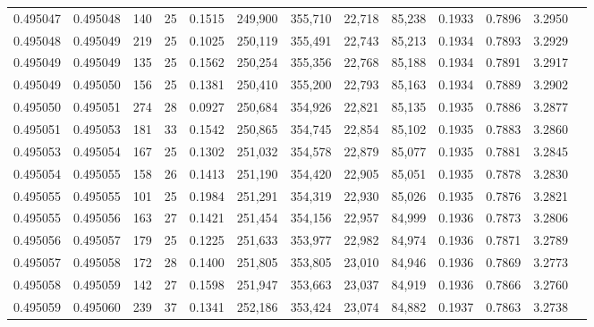 \begin{tabular}{rrrrrrrrrrrrr}
0.495047 & 0.495048 & 140 &  25 &                                     0.1515 & 249,900 & 355,710 &  22,718 &  85,238 & 0.1933 & 0.7896 & 3.2950 \\
0.495048 & 0.495049 & 219 &  25 &                                     0.1025 & 250,119 & 355,491 &  22,743 &  85,213 & 0.1934 & 0.7893 & 3.2929 \\
0.495049 & 0.495049 & 135 &  25 &                                     0.1562 & 250,254 & 355,356 &  22,768 &  85,188 & 0.1934 & 0.7891 & 3.2917 \\
0.495049 & 0.495050 & 156 &  25 &                                     0.1381 & 250,410 & 355,200 &  22,793 &  85,163 & 0.1934 & 0.7889 & 3.2902 \\
0.495050 & 0.495051 & 274 &  28 &                                     0.0927 & 250,684 & 354,926 &  22,821 &  85,135 & 0.1935 & 0.7886 & 3.2877 \\
0.495051 & 0.495053 & 181 &  33 &                                     0.1542 & 250,865 & 354,745 &  22,854 &  85,102 & 0.1935 & 0.7883 & 3.2860 \\
0.495053 & 0.495054 & 167 &  25 &                                     0.1302 & 251,032 & 354,578 &  22,879 &  85,077 & 0.1935 & 0.7881 & 3.2845 \\
0.495054 & 0.495055 & 158 &  26 &                                     0.1413 & 251,190 & 354,420 &  22,905 &  85,051 & 0.1935 & 0.7878 & 3.2830 \\
0.495055 & 0.495055 & 101 &  25 &                                     0.1984 & 251,291 & 354,319 &  22,930 &  85,026 & 0.1935 & 0.7876 & 3.2821 \\
0.495055 & 0.495056 & 163 &  27 &                                     0.1421 & 251,454 & 354,156 &  22,957 &  84,999 & 0.1936 & 0.7873 & 3.2806 \\
0.495056 & 0.495057 & 179 &  25 &                                     0.1225 & 251,633 & 353,977 &  22,982 &  84,974 & 0.1936 & 0.7871 & 3.2789 \\
0.495057 & 0.495058 & 172 &  28 &                                     0.1400 & 251,805 & 353,805 &  23,010 &  84,946 & 0.1936 & 0.7869 & 3.2773 \\
0.495058 & 0.495059 & 142 &  27 &                                     0.1598 & 251,947 & 353,663 &  23,037 &  84,919 & 0.1936 & 0.7866 & 3.2760 \\
0.495059 & 0.495060 & 239 &  37 &                                     0.1341 & 252,186 & 353,424 &  23,074 &  84,882 & 0.1937 & 0.7863 & 3.2738 \\

\end{tabular}
